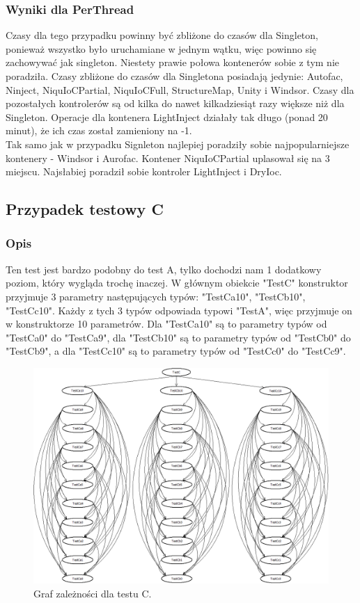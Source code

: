 \documentclass[12pt]{article}
\begin{document}
\subsubsection{Wyniki dla PerThread}
Czasy dla tego przypadku powinny być zbliżone do czasów dla Singleton, ponieważ wszystko było uruchamiane w jednym wątku, więc powinno się zachowywać jak singleton. Niestety prawie połowa kontenerów sobie z tym nie poradziła. Czasy zbliżone do czasów dla Singletona posiadają jedynie: Autofac, Ninject, NiquIoCPartial, NiquIoCFull, StructureMap, Unity i Windsor. Czasy dla pozostałych kontrolerów są od kilka do nawet kilkadziesiąt razy większe niż dla Singleton. Operacje dla kontenera LightInject działały tak długo (ponad 20 minut), że ich czas został zamieniony na -1.\\
Tak samo jak w przypadku Signleton najlepiej poradziły sobie najpopularniejsze kontenery - Windsor i Aurofac. Kontener NiquIoCPartial uplasował się na 3 miejscu. Najsłabiej poradził sobie kontroler LightInject i DryIoc.


\subsection{Przypadek testowy C}
\subsubsection{Opis}
Ten test jest bardzo podobny do test A, tylko dochodzi nam 1 dodatkowy poziom, który wygląda trochę inaczej. W głównym obiekcie "TestC" konstruktor przyjmuje 3 parametry następujących typów: "TestCa10", "TestCb10", "TestCc10". Każdy z tych 3 typów odpowiada typowi "TestA", więc przyjmuje on w konstruktorze 10 parametrów. Dla "TestCa10" są to parametry typów od "TestCa0" do "TestCa9", dla "TestCb10" są to parametry typów od "TestCb0" do "TestCb9", a dla "TestCc10" są to parametry typów od "TestCc0" do "TestCc9".\\

\begin{figure}[h]
	\begin{center}
  		\includegraphics[width=\linewidth]{TestC.png}
  		\caption{Graf zależności dla testu C.}
  		\label{fig:testC}
	\end{center}
\end{figure}
\end{document}
